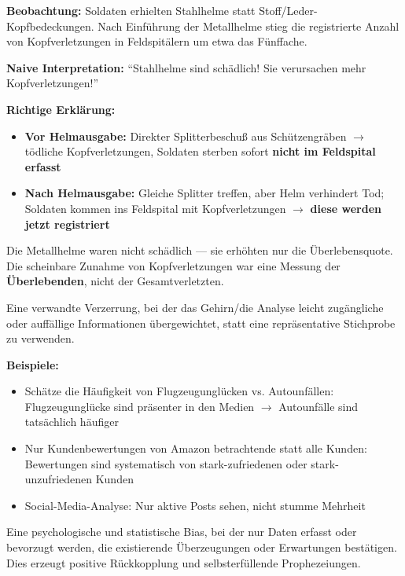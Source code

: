 
\textbf{Beobachtung:} Soldaten erhielten Stahlhelme statt Stoff/Leder-Kopfbedeckungen. Nach Einführung der Metallhelme stieg die registrierte Anzahl von Kopfverletzungen in Feldspitälern um etwa das Fünffache.

\textbf{Naive Interpretation:} ``Stahlhelme sind schädlich! Sie verursachen mehr Kopfverletzungen!''

\textbf{Richtige Erklärung:} 
\begin{itemize}[leftmargin=1.5em]
    \item \textbf{Vor Helmausgabe:} Direkter Splitterbeschuß aus Schützengräben $\to$ tödliche Kopfverletzungen, Soldaten sterben sofort \textbf{nicht im Feldspital erfasst}
    \item \textbf{Nach Helmausgabe:} Gleiche Splitter treffen, aber Helm verhindert Tod; Soldaten kommen ins Feldspital mit Kopfverletzungen $\to$ \textbf{diese werden jetzt registriert}
\end{itemize}

Die Metallhelme waren nicht schädlich — sie erhöhten nur die Überlebensquote. Die scheinbare Zunahme von Kopfverletzungen war eine Messung der \textbf{Überlebenden}, nicht der Gesamtverletzten.

Eine verwandte Verzerrung, bei der das Gehirn/die Analyse leicht zugängliche oder auffällige Informationen übergewichtet, statt eine repräsentative Stichprobe zu verwenden.

\textbf{Beispiele:}
\begin{itemize}[leftmargin=1.5em]
    \item Schätze die Häufigkeit von Flugzeugunglücken vs. Autounfällen: Flugzeugunglücke sind präsenter in den Medien $\to$ Autounfälle sind tatsächlich häufiger
    \item Nur Kundenbewertungen von Amazon betrachtende statt alle Kunden: Bewertungen sind systematisch von stark-zufriedenen oder stark-unzufriedenen Kunden
    \item Social-Media-Analyse: Nur aktive Posts sehen, nicht stumme Mehrheit
\end{itemize}

Eine psychologische und statistische Bias, bei der nur Daten erfasst oder bevorzugt werden, die existierende Überzeugungen oder Erwartungen bestätigen. Dies erzeugt positive Rückkopplung und selbsterfüllende Prophezeiungen.

